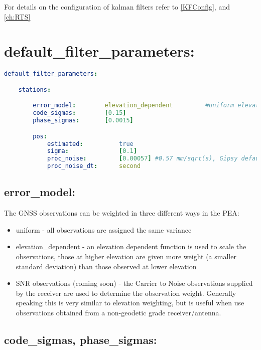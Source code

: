 For details on the configuration of kalman filters refer to \ref{KFConfig}, and \ref{ch:RTS}










\section{default\_filter\_parameters:}



\begin{lstlisting}[language=yaml,caption=Default\_filter\_parameters]
default_filter_parameters:

    stations:

        error_model:        elevation_dependent         #uniform elevation_dependent
        code_sigmas:        [0.15]
        phase_sigmas:       [0.0015]

        pos:
            estimated:          true
            sigma:              [0.1]
            proc_noise:         [0.00057] #0.57 mm/sqrt(s), Gipsy default value from slow-moving
            proc_noise_dt:      second
\end{lstlisting}


\subsection*{error\_model:}

The GNSS observations can be weighted in three different ways in the PEA:
\begin{itemize}
    \item uniform - all observations are assigned the same variance
    \item elevation\_dependent - an elevation dependent function is used to scale the observations, those at higher elevation are given more weight (a smaller standard deviation) than those observed at lower elevation
    \item SNR observations (coming soon) - the Carrier to Noise observations supplied by the receiver are used to determine the observation weight. Generally speaking this is very similar to elevation weighting, but is useful when use observations obtained from a non-geodetic grade receiver/antenna.
\end{itemize}

\subsection*{code\_sigmas, phase\_sigmas:}

